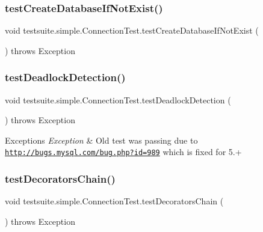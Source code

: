 \subsubsection{\texorpdfstring{test\+Create\+Database\+If\+Not\+Exist()}{testCreateDatabaseIfNotExist()}}
{\footnotesize\ttfamily void testsuite.\+simple.\+Connection\+Test.\+test\+Create\+Database\+If\+Not\+Exist (\begin{DoxyParamCaption}{ }\end{DoxyParamCaption}) throws Exception}

\mbox{\label{classtestsuite_1_1simple_1_1_connection_test_afeddb6540162d5a3efe572d521dcc051}} 
\subsubsection{\texorpdfstring{test\+Deadlock\+Detection()}{testDeadlockDetection()}}
{\footnotesize\ttfamily void testsuite.\+simple.\+Connection\+Test.\+test\+Deadlock\+Detection (\begin{DoxyParamCaption}{ }\end{DoxyParamCaption}) throws Exception}


\begin{DoxyExceptions}{Exceptions}
{\em Exception} & Old test was passing due to \href{http://bugs.mysql.com/bug.php?id=989}{\tt http\+://bugs.\+mysql.\+com/bug.\+php?id=989} which is fixed for 5.+ \\
\hline
\end{DoxyExceptions}
\mbox{\label{classtestsuite_1_1simple_1_1_connection_test_ac015cfb2b5173cb9e4af4d1bd3886c83}} 
\subsubsection{\texorpdfstring{test\+Decorators\+Chain()}{testDecoratorsChain()}}
{\footnotesize\ttfamily void testsuite.\+simple.\+Connection\+Test.\+test\+Decorators\+Chain (\begin{DoxyParamCaption}{ }\end{DoxyParamCaption}) throws Exception}

